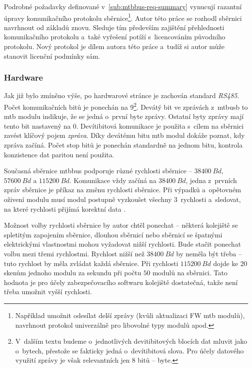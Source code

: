 Podrobné požadavky definované v~\ref{sub:mtbbus-req-summary} vynucují razantní
úpravy komunikačního protokolu sběrnice\footnote{Například umožnit odesílat
delší zprávy (kvůli aktualizaci FW \gls{mtb} modulů), navrhnout protokol
univerzálně pro libovolné typy modulů apod.}. Autor této práce se rozhodl
sběrnici navrhnout od základů znovu. Sleduje tím především zajištění
přehlednosti komunikačního protokolu a~také vyřešení potíží s~licencováním
původního protokolu. Nový protokol je dílem autora této práce a~tudíž si autor
může stanovit licenční podmínky sám.

\subsubsection{Hardware}

Jak již bylo zmíněno výše, po hardwarové stránce je zachován standard
\textit{RS485}. Počet komunikačních bitů je ponechán na 9\footnote{
V~dalším textu budeme o~jednotlivých devitibitových blocích dat mluvit jako
o~bytech, přestože se fakticky jedná o~devítibitová slova. Pro účely datového
využití zprávy je však relevantních jen 8 bitů – byte.}.
Devátý bit ve zprávách z~\gls{mtbusb} to \gls{mtb} modulu indikuje, že
se jedná o~první byte zprávy. Ostatní byty zprávy mají tento bit nastavený na
0. Devítibitová komunikace je použita s~cílem na sběrnici zavést klíčový pojem
\textit{zpráva}. Díky devátému bitu \gls{mtb} modul dokáže poznat, kdy zpráva
začíná. Počet stop bitů je ponechán standardně na jednom bitu, kontrola
konzistence dat paritou není použita.

Současná sběrnice \gls{mtbbus} podporuje různé rychlosti sběrnice –
$38400~Bd$, $57600~Bd$ a $115200~Bd$. Komunikace vždy začíná na
$38400~Bd$, jedna z~prvních zpráv sběrnice je příkaz na změnu rychlosti
sběrnice. Při výpadků a~opětovném oživení modulu musí modul postupně vyzkoušet
všechny 3~rychlosti a~sledovat, na které rychlosti přijímá korektní data
\cite{mtbbus-specs}.

Možnost volby rychlosti sběrnice by autor chtěl ponechat – některá kolejiště se
spletitým zapojením sběrnice, dlouhou sběrnicí nebo sběrnicí se špatnými elektrickými
vlastnostmi mohou vyžadovat nižší rychlosti. Bude stačit ponechat volbu mezi
třemi rychlostmi.
Rychlost nižší než $38400~Bd$ by neměla být třeba – tuto rychlost by měla
zvládat každá sběrnice. Při rychlosti $115200~Bd$ dojde ke $20$ skenům
jednoho modulu za sekundu při počtu $50$ modulů na sběrnici. Tato hodnota je
pro účely zabezpečovacího softwaru kolejiště dostatečná, takže není
třeba umožnit vyšší rychlosti.


